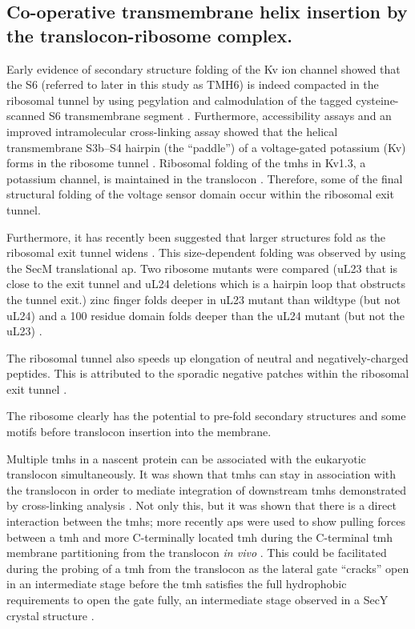 \subsection{Co-operative transmembrane helix insertion by the translocon-ribosome complex.}

Early evidence of secondary structure folding of the Kv ion channel showed that the S6 (referred to later in this study as TMH6) is indeed compacted in the ribosomal tunnel by using pegylation and calmodulation of the tagged cysteine-scanned S6 transmembrane segment \cite{Lu2005}.
Furthermore, accessibility assays and an improved intramolecular  cross\--linking assay showed that the helical transmembrane S3b–S4 hairpin (the “paddle”) of a voltage-gated potassium (Kv) forms in the ribosome tunnel \cite{Tu2014}.
Ribosomal folding of the \gls{tmh}s in Kv1.3, a potassium channel, is maintained in the translocon \cite{Tu2010a}.
Therefore, some of the final structural folding of the voltage sensor domain occur within the ribosomal exit tunnel.

Furthermore, it has recently been suggested that larger structures fold as the ribosomal exit tunnel widens \cite{Kudva2018}.
This size\--dependent folding was observed by using the SecM translational \gls{ap}.
Two ribosome mutants were compared (uL23 that is close to the exit tunnel and uL24 deletions which is a hairpin loop that obstructs the tunnel exit.) zinc finger folds deeper in uL23 mutant than wildtype (but not uL24) and a 100 residue domain folds deeper than the uL24 mutant (but not the uL23) \cite{Kudva2018}.

The ribosomal tunnel also speeds up elongation of neutral and negatively-charged peptides.
This is attributed to the sporadic negative patches within the ribosomal exit tunnel \cite{Lu2008}.

The ribosome clearly has the potential to pre\--fold secondary structures and some motifs before translocon insertion into the membrane.

Multiple \gls{tmh}s in a nascent protein can be associated with the eukaryotic translocon simultaneously.
It was shown that \gls{tmh}s can stay in association with the translocon in order to mediate integration of downstream \gls{tmh}s demonstrated by  cross\--linking analysis \cite{Sadlish2005, Cross2009}.
Not only this, but it was shown that there is a direct interaction between the \gls{tmh}s; more recently \gls{ap}s were used to show pulling forces between a \gls{tmh} and more C-terminally located \gls{tmh} during the C-terminal \gls{tmh} membrane partitioning from the translocon \textit{in vivo} \cite{Cymer2013}.
This could be facilitated during the probing of a \gls{tmh} from the translocon as the lateral gate ``cracks'' open in an intermediate stage before the \gls{tmh} satisfies the full hydrophobic requirements to open the gate fully, an intermediate stage observed in a SecY crystal structure \cite{Egea2010}.

